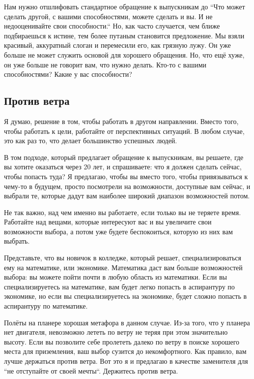 \documentclass[ebook,12pt,oneside,openany]{memoir}
\begin{document}
Нам нужно отшлифовать стандартное обращение к выпускникам до ``Что
может сделать другой, с вашими способностями, можете сделать и вы. И
не недооценивайте свои способности.`` Но, как часто случается, чем
ближе подбираешься к истине, тем более путаным становится предложение.
Мы взяли красивый, аккуратный слоган и перемесили его, как грязную
лужу. Он уже больше не может служить основой для хорошего обращения.
Но, что ещё хуже, он уже больше не говорит вам, что нужно делать.
Кто-то с вашими способностями? Какие у вас способности? \newline

\subsection{Против ветра}

Я думаю, решение в том, чтобы работать в другом направлении. Вместо
того, чтобы работать к цели, работайте от перспективных ситуаций. В
любом случае, это как раз то, что делает большинство успешных людей. \newline

В том подходе, который предлагает обращение к выпускникам, вы решаете,
где вы хотите оказаться через 20 лет, и спрашиваете: что я должен
сделать сейчас, чтобы попасть туда? Я предлагаю, чтобы вы вместо того,
чтобы привязываться к чему-то в будущем, просто посмотрели на
возможности, доступные вам сейчас, и выбрали те, которые дадут вам
наиболее широкий диапазон возможностей потом. \newline

Не так важно, над чем именно вы работаете, если только вы не теряете
время. Работайте над вещами, которые интересуют вас и вы увеличите
свои возможности выбора, а потом уже будете беспокоиться, которую из
них вам выбрать. \newline

Представьте, что вы новичок в колледже, который решает,
специализироваться ему на математике, или экономике. Математика даст
вам больше возможностей выбора: вы можете пойти почти в любую область
из математики. Если вы специализируетесь на математике, вам будет
легко попасть в аспирантуру по экономике, но если вы специализируетесь
на экономике, будет сложно попасть в аспирантуру по математике. \newline

Полёты на планере хорошая метафора в данном случае. Из-за того, что у
планера нет двигателя, невозможно лететь по ветру не теряя при этом
значительно высоту. Если вы позволите себе пролететь далеко по ветру в
поиске хорошего места для приземления, ваш выбор сузится до
некомфортного. Как правило, вам лучше держаться против ветра. Вот это
я и предлагаю в качестве заменителя для ``не отступайте от своей
мечты``. Держитесь против ветра. \newline
\end{document}

